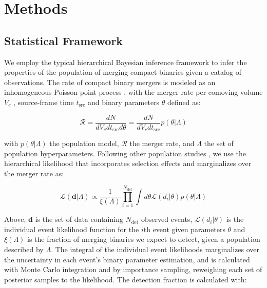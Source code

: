 \section{Methods} \label{sec:methods}

\subsection{Statistical Framework} \label{sec:statistical_framework}

We employ the typical hierarchical Bayesian inference framework to infer the properties of the population of merging compact binaries given a catalog of observations. The rate of compact binary mergers is modeled as an inhomogeneous Poisson point process \citep{10.1093/mnras/stz896}, with the merger rate per comoving volume $V_c$ \citep{astro-ph/9905116}, source-frame time $t_\text{src}$ and binary parameters $\theta$ defined as:

\begin{equation} \label{eq:rate}
    \mathcal{R} = \frac{dN}{dV_cdt_\mathrm{src}d\theta} = \frac{dN}{dV_cdt_\mathrm{src}} p(\theta | \Lambda)
\end{equation}

\noindent with $p(\theta | \Lambda)$ the population model, $\mathcal{R}$ the merger rate, and $\Lambda$ the set of population hyperparameters. Following other population studies \citep{10.1093/mnras/stz896,2021ApJ...913L...7A,2023PhRvX..13a1048A,2007.05579}, we use the hierarchical likelihood \citep{10.1063/1.1835214} that incorporates selection effects and marginalizes over the merger rate as: 

\begin{equation} \label{eq:likelihood}
    \mathcal{L}(\bm{d} | \Lambda) \propto \frac{1}{\xi(\Lambda)} \prod_{i=1}^{N_\mathrm{det}} \int d\theta \mathcal{L}(d_i | \theta) p(\theta | \Lambda)
\end{equation}

\noindent Above, $\bm{d}$ is the set of data containing $N_\mathrm{det}$ observed events, $\mathcal{L}(d_i | \theta)$ is the individual event likelihood function for the $i$th event given parameters $\theta$ and $\xi(\Lambda)$ is the fraction of merging binaries we expect to detect, given a population described by $\Lambda$. The integral of the individual event likelihoods marginalizes over the uncertainty in each event's binary parameter estimation, and is calculated with Monte Carlo integration and by importance sampling, reweighing each set of posterior samples to the likelihood. The detection fraction is calculated with:

